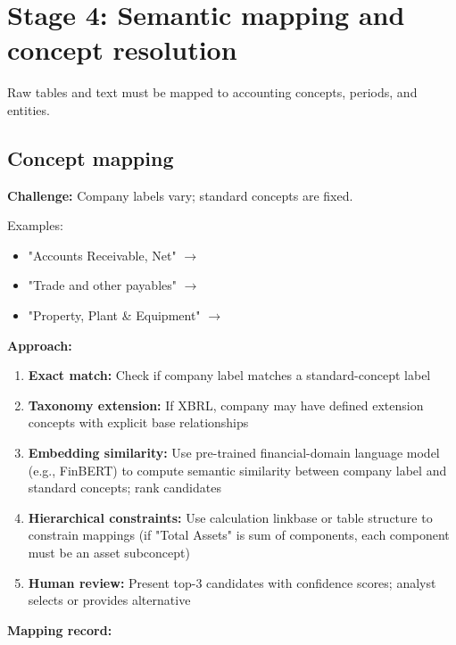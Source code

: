 \section{Stage 4: Semantic mapping and concept resolution}

Raw tables and text must be mapped to accounting concepts, periods, and entities.

\subsection{Concept mapping}

\textbf{Challenge:} Company labels vary; standard concepts are fixed.

Examples:
\begin{itemize}
\item "Accounts Receivable, Net" $\rightarrow$ 
\item "Trade and other payables" $\rightarrow$ 
\item "Property, Plant \& Equipment" $\rightarrow$ 
\end{itemize}

\textbf{Approach:}

\begin{enumerate}
\item \textbf{Exact match:} Check if company label matches a standard-concept label
\item \textbf{Taxonomy extension:} If XBRL, company may have defined extension
  concepts with explicit base relationships
\item \textbf{Embedding similarity:} Use pre-trained financial-domain language
  model (e.g., FinBERT) to compute semantic similarity between company label and
  standard concepts; rank candidates
\item \textbf{Hierarchical constraints:} Use calculation linkbase or table structure
  to constrain mappings (if "Total Assets" is sum of components, each component must
  be an asset subconcept)
\item \textbf{Human review:} Present top-3 candidates with confidence scores; analyst
  selects or provides alternative
\end{enumerate}

\textbf{Mapping record:}

